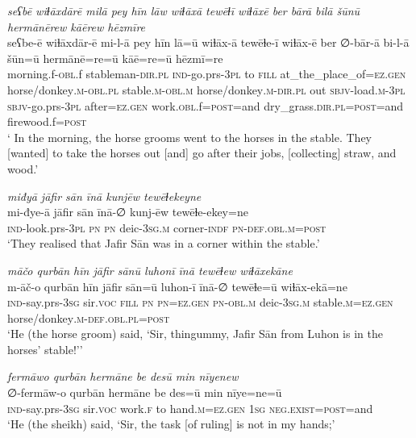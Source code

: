 \ea \label{ŠJ.66}
\textit{seʕbē wiɫāxdārē milā pey hīn lāw wiɫāxā tewēɫī wiɫāxē ber bārā bilā šūnū hermānērew kāērew hēzmīre} \\ 
\gll seʕbe-ē wiɫāxdār-ē mi-l-ā pey hīn lā=ū wiɫāx-ā tewēɫe-ī wiɫāx-ē ber ∅-bār-ā bi-l-ā šūn=ū hermānē=re=ū kāē=re=ū hēzmī=re \\ 
 morning.f\textsc{-obl}.f stableman\textsc{-dir}\textsc{.pl} \textsc{ind-}go.prs\textsc{-3pl} to \textsc{fill} at\_the\_place\_of\textsc{=ez.gen} horse/donkey\textsc{.m}\textsc{-obl}\textsc{.pl} stable\textsc{.m}\textsc{-obl}\textsc{.m} horse/donkey\textsc{.m}\textsc{-dir}\textsc{.pl} out \textsc{sbjv-}load\textsc{.m}\textsc{-3pl} \textsc{sbjv-}go.prs\textsc{-3pl} after\textsc{=ez.gen} work\textsc{.obl}.f\textsc{=\textsc{post}}=and dry\_grass\textsc{.dir}\textsc{.pl}\textsc{=\textsc{post}}=and firewood.f\textsc{=\textsc{post}} \\ 
\glt ` In the morning, the horse grooms went to the horses in the stable. They [wanted] to take the horses out [and] go after their jobs, [collecting] straw, and wood.'
\z 
 
\ea \label{ŠJ.67}
\textit{miđyā jāfir sān īnā kunjēw tewēɫekeyne} \\ 
\gll mi-đye-ā jāfir sān īnā-∅ kunj-ēw tewēɫe-ekey=ne \\ 
 \textsc{ind-}look.prs\textsc{-3pl} \textsc{pn} \textsc{pn} deic\textsc{-3sg}\textsc{.m} corner\textsc{-indf} \textsc{pn}\textsc{-def}\textsc{.obl}\textsc{.m}\textsc{=\textsc{post}} \\ 
\glt `They realised that Jafir Sān was in a corner within the stable.'
\z 
 
\ea \label{ŠJ.71}
\textit{māčo qurbān hīn jāfir sānū luhonī īnā tewēɫew wiɫāxekāne} \\ 
\gll m-āč-o qurbān hīn jāfir sān=ū luhon-ī īnā-∅ tewēɫe=ū wiɫāx-ekā=ne \\ 
 \textsc{ind-}say.prs\textsc{-3sg} sir.\textsc{voc} \textsc{fill} \textsc{pn} \textsc{pn}\textsc{=ez.gen} \textsc{pn}\textsc{-obl}\textsc{.m} deic\textsc{-3sg}\textsc{.m} stable\textsc{.m}\textsc{=ez.gen} horse/donkey\textsc{.m}\textsc{-def}\textsc{.obl}\textsc{.pl}\textsc{=\textsc{post}} \\ 
\glt `He (the horse groom) said, ‘Sir, thingummy, Jafir Sān from Luhon is in the horses’ stable!’'
\z 
 
\ea \label{ŠJ.86}
\textit{fermāwo qurbān hermāne be desū min nīyenew} \\ 
\gll ∅-fermāw-o qurbān hermāne be des=ū min nīye=ne=ū \\ 
 \textsc{ind-}say.prs\textsc{-3sg} sir.\textsc{voc} work\textsc{.f} to hand\textsc{.m}\textsc{=ez.gen} \textsc{1sg} \textsc{\textsc{neg.}exist}\textsc{=\textsc{post}}=and \\ 
\glt `He (the sheikh) said, ‘Sir, the task [of ruling] is not in my hands;'
\z 
 
